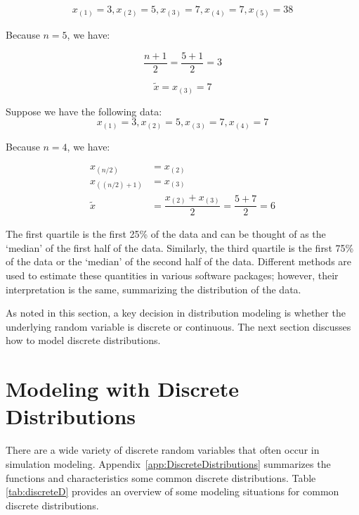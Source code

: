 \documentclass[
]{book}
\theoremstyle{definition}
\theoremstyle{definition}
\theoremstyle{definition}
\theoremstyle{definition}
\theoremstyle{remark}
\begin{document}
\[x_{(1)} = 3, x_{(2)} = 5, x_{(3)} = 7, x_{(4)} = 7, x_{(5)} = 38\]

Because \(n = 5\), we have:

\[\dfrac{n + 1}{2} = \dfrac{5 + 1}{2} = 3\]

\[\tilde{x} = x_{(3)} = 7\]

Suppose we have the following data:
\[x_{(1)} = 3, x_{(2)} = 5, x_{(3)} = 7, x_{(4)} = 7\]

Because \(n=4\), we have:

\[\begin{aligned}
x_{(n/2)} & = x_{(2)}\\
x_{((n/2) + 1)} & = x_{(3)}\\
\tilde{x} & = \dfrac{x_{(2)} + x_{(3)}}{2} = \dfrac{5 + 7}{2} = 6\end{aligned}\]

The first quartile is the first 25\% of the data and can be thought of as
the `median' of the first half of the data. Similarly, the third
quartile is the first 75\% of the data or the `median' of the second half
of the data. Different methods are used to estimate these quantities in
various software packages; however, their interpretation is the same,
summarizing the distribution of the data.

As noted in this section, a key decision in distribution modeling is whether the underlying random variable is discrete or continuous. The next section discusses how to model discrete distributions.

\hypertarget{app:idm:sec:MDD}{%
\section{Modeling with Discrete Distributions}\label{app:idm:sec:MDD}}

There are a wide variety of discrete random variables that often occur
in simulation modeling. Appendix~\ref{app:DiscreteDistributions} summarizes the functions and characteristics some common discrete
distributions. Table \ref{tab:discreteD} provides an overview of some modeling situations for common discrete distributions.
\end{document}
